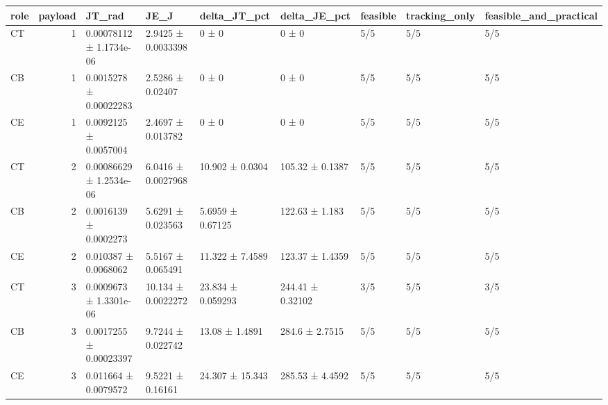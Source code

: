 \begin{tabular}{lrlllllll}
\toprule
role & payload & JT\_rad & JE\_J & delta\_JT\_pct & delta\_JE\_pct & feasible & tracking\_only & feasible\_and\_practical \\
\midrule
CT & 1 & 0.00078112 ± 1.1734e-06 & 2.9425 ± 0.0033398 & 0 ± 0 & 0 ± 0 & 5/5 & 5/5 & 5/5 \\
CB & 1 & 0.0015278 ± 0.00022283 & 2.5286 ± 0.02407 & 0 ± 0 & 0 ± 0 & 5/5 & 5/5 & 5/5 \\
CE & 1 & 0.0092125 ± 0.0057004 & 2.4697 ± 0.013782 & 0 ± 0 & 0 ± 0 & 5/5 & 5/5 & 5/5 \\
CT & 2 & 0.00086629 ± 1.2534e-06 & 6.0416 ± 0.0027968 & 10.902 ± 0.0304 & 105.32 ± 0.1387 & 5/5 & 5/5 & 5/5 \\
CB & 2 & 0.0016139 ± 0.0002273 & 5.6291 ± 0.023563 & 5.6959 ± 0.67125 & 122.63 ± 1.183 & 5/5 & 5/5 & 5/5 \\
CE & 2 & 0.010387 ± 0.0068062 & 5.5167 ± 0.065491 & 11.322 ± 7.4589 & 123.37 ± 1.4359 & 5/5 & 5/5 & 5/5 \\
CT & 3 & 0.0009673 ± 1.3301e-06 & 10.134 ± 0.0022272 & 23.834 ± 0.059293 & 244.41 ± 0.32102 & 3/5 & 5/5 & 3/5 \\
CB & 3 & 0.0017255 ± 0.00023397 & 9.7244 ± 0.022742 & 13.08 ± 1.4891 & 284.6 ± 2.7515 & 5/5 & 5/5 & 5/5 \\
CE & 3 & 0.011664 ± 0.0079572 & 9.5221 ± 0.16161 & 24.307 ± 15.343 & 285.53 ± 4.4592 & 5/5 & 5/5 & 5/5 \\
\bottomrule
\end{tabular}
